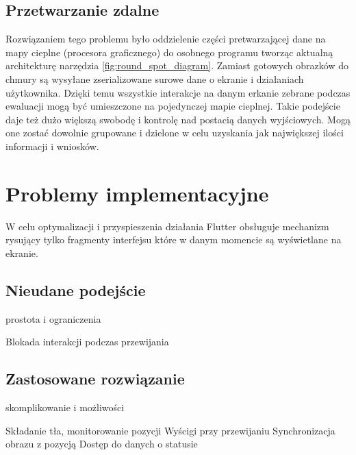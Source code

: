 \subsection{Przetwarzanie zdalne}
Rozwiązaniem tego problemu było oddzielenie części pretwarzającej dane na mapy cieplne (procesora graficznego) do osobnego programu tworząc aktualną architekturę narzędzia \ref{fig:round_spot_diagram}. Zamiast gotowych obrazków do chmury są wysyłane zserializowane surowe dane o ekranie i działaniach użytkownika. Dzięki temu wszystkie interakcje na danym erkanie zebrane podczas ewaluacji mogą być umieszczone na pojedynczej mapie cieplnej. Takie podejście daje też dużo większą swobodę i kontrolę nad postacią danych wyjściowych. Mogą one zostać dowolnie grupowane i dzielone w celu uzyskania jak największej ilości informacji i wniosków.

\section{Problemy implementacyjne}
W celu optymalizacji i przyspieszenia działania Flutter obsługuje mechanizm rysujący tylko fragmenty interfejsu które w danym momencie są wyświetlane na ekranie.

\subsection{Nieudane podejście}
prostota i ograniczenia

Blokada interakcji podczas przewijania

\subsection{Zastosowane rozwiązanie}
skomplikowanie i możliwości

Składanie tła, monitorowanie pozycji
Wyścigi przy przewijaniu
Synchronizacja obrazu z pozycją
Dostęp do danych o statusie
